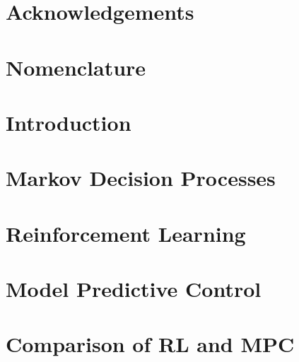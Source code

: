 \documentclass[12pt]{report}
\begin{document}
\tableofcontents
\listoffigures
\listoftables

\chapter*{Acknowledgements}

\chapter*{Nomenclature}

\chapter{Introduction}


\chapter{Markov Decision Processes}


\chapter{Reinforcement Learning}


\chapter{Model Predictive Control}


\chapter{Comparison of RL and MPC}


\printbibliography
\end{document}
